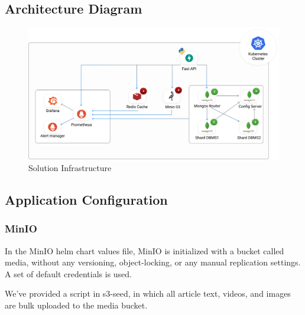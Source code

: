 \documentclass{article}
\begin{document}
    \subsection{Architecture Diagram}
    \begin{figure}[hpp]
        \centering
        \includegraphics[width=16cm]{images/cluster.png}
        \caption{Solution Infrastructure}
        \label{fig:cluster}
    \end{figure}

    \subsection{Application Configuration}

    \subsubsection{MinIO}
    In the MinIO helm chart values file, MinIO is initialized with a bucket called media, without any versioning, object-locking, or any manual replication settings.
    A set of default credentials is used.

    We've provided a script in s3-seed, in which all article text, videos, and images are bulk uploaded to the media bucket.
\end{document}
